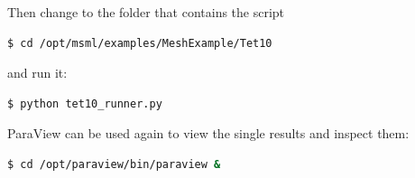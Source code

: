 Then change to the folder that contains the script
\begin{lstlisting}[language=sh, breaklines=true]
$ cd /opt/msml/examples/MeshExample/Tet10
\end{lstlisting}

and run it:
\begin{lstlisting}[language=sh, breaklines=true]
$ python tet10_runner.py
\end{lstlisting}

ParaView can be used again to view the single results and inspect them:
\begin{lstlisting}[language=sh, breaklines=true]
$ cd /opt/paraview/bin/paraview &
\end{lstlisting}